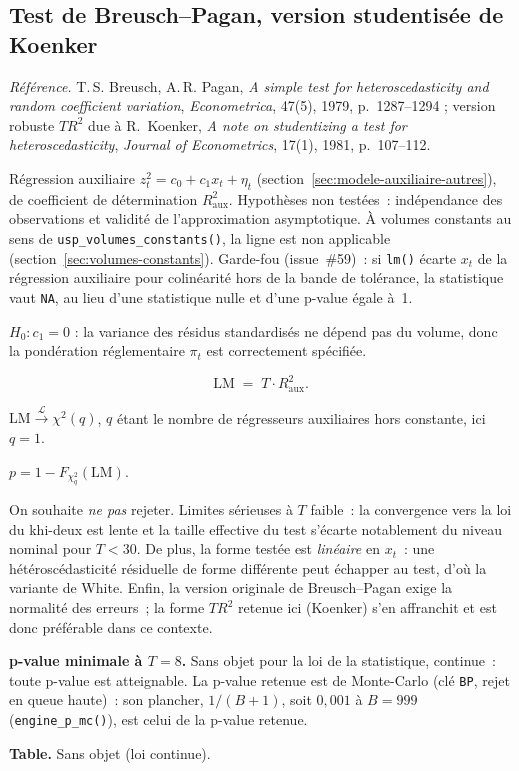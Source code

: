 \documentclass[a4paper,11pt]{article}
\newcommand{\code}[1]{\texttt{\small #1}}
\newcommand{\refl}[1]{{\small\textcolor{maincolor!70!black}{\textit{Référence.} #1}}\par\smallskip}
\newcounter{ficheid}
\newenvironment{fiche}[1]{%
  \stepcounter{ficheid}%
  \phantomsection
  \subsection{#1}%
  \label{fiche:\theficheid}%
}{%
  \end{description}\vspace{0.5em}%
}
\newcommand{\Cadre}{%
  \begin{description}[leftmargin=0pt, style=unboxed, itemsep=3pt, topsep=3pt, parsep=2pt]%
  \item[\textcolor{financeblue}{\textbf{1. Cadre, notations et hypothèses de validité (non testées).}}]}
\newcommand{\Hzero}{\item[\textcolor{financeblue}{\textbf{2. Hypothèse nulle.}}]}
\newcommand{\Stat}{\item[\textcolor{financeblue}{\textbf{3. Statistique de test.}}]}
\newcommand{\Loi}{\item[\textcolor{financeblue}{\textbf{4. Loi sous $H_0$.}}]}
\newcommand{\Pval}{\item[\textcolor{financeblue}{\textbf{5. p-value.}}]}
\newcommand{\Usage}{\item[\textcolor{financeblue}{\textbf{6. Usage et limites.}}]}
\newcommand{\Pertinence}{\item[\textcolor{financeblue}{\textbf{7. Pertinence et puissance à faible $T$.}}]}
\begin{document}
\begin{fiche}{Test de Breusch--Pagan, version studentisée de Koenker}
\label{fiche:breusch-pagan-koenker}%
\refl{T.\,S. Breusch, A.\,R. Pagan, \emph{A simple test for heteroscedasticity and random
coefficient variation}, \emph{Econometrica}, 47(5), 1979, p.~1287--1294 ; version robuste
$T R^2$ due à R.~Koenker, \emph{A note on studentizing a test for heteroscedasticity},
\emph{Journal of Econometrics}, 17(1), 1981, p.~107--112.}
\Cadre
Régression auxiliaire $z_t^2 = c_0 + c_1 x_t + \eta_t$ (section~\ref{sec:modele-auxiliaire-autres}), de coefficient de détermination
$R^2_{\text{aux}}$. Hypothèses non testées~: indépendance des observations et validité de
l'approximation asymptotique. À volumes constants au sens de \code{usp\_volumes\_constants()}, la ligne est non applicable
(section~\ref{sec:volumes-constants}). Garde-fou (issue~\#59)~: si \code{lm()} écarte $x_t$
de la régression auxiliaire pour colinéarité hors de la bande de tolérance, la statistique vaut
\code{NA}, au lieu d'une statistique nulle et d'une p-value égale à~1.
\Hzero
$H_0 : c_1 = 0$ : la variance des résidus standardisés ne dépend pas du volume, donc la pondération
réglementaire $\pi_t$ est correctement spécifiée.
\Stat
\[
  \mathrm{LM} \;=\; T \cdot R^2_{\text{aux}} .
\]
\Loi
$\mathrm{LM} \xrightarrow{\ \mathcal{L}\ } \chi^2(q)$, $q$ étant le nombre de régresseurs
auxiliaires hors constante, ici $q = 1$.
\Pval
$p = 1 - F_{\chi^2_q}(\mathrm{LM})$.
\Usage
On souhaite \emph{ne pas} rejeter. Limites sérieuses à $T$ faible~: la convergence vers la loi du
khi-deux est lente et la taille effective du test s'écarte notablement du niveau nominal pour
$T < 30$. De plus, la forme testée est \emph{linéaire} en $x_t$~: une hétéroscédasticité
résiduelle de forme différente peut échapper au test, d'où la variante de White. Enfin, la
version originale de Breusch--Pagan exige la normalité des erreurs~; la forme $T R^2$ retenue ici
(Koenker) s'en affranchit et est donc préférable dans ce contexte.
\Pertinence
\textbf{p-value minimale à $T = 8$.} Sans objet pour la loi de la statistique, continue~: toute p-value est atteignable. La p-value retenue est de Monte-Carlo (clé \code{BP}, rejet en queue haute)~: son plancher, $1/(B+1)$, soit $0{,}001$ à $B = 999$ (\code{engine\_p\_mc()}), est celui de la p-value retenue.

\textbf{Table.} Sans objet (loi continue).


\end{fiche}
\end{document}
